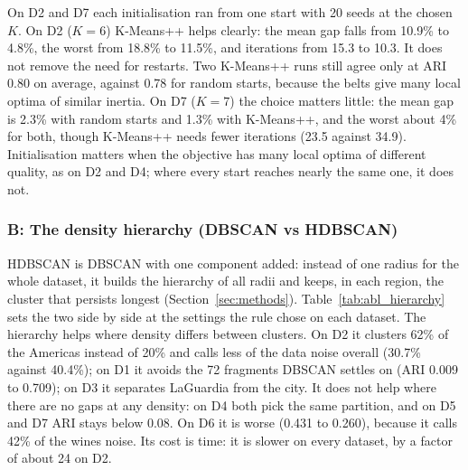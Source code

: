 On D2 and D7 each initialisation ran from one start with 20 seeds at the chosen $K$. On D2 ($K=6$)
K-Means++ helps clearly: the mean gap falls from 10.9\% to 4.8\%, the worst from 18.8\% to 11.5\%, and
iterations from 15.3 to 10.3. It does not remove the need for restarts. Two K-Means++ runs still agree
only at ARI 0.80 on average, against 0.78 for random starts, because the belts give many local optima of
similar inertia. On D7 ($K=7$) the choice matters little: the mean gap is 2.3\% with random starts and
1.3\% with K-Means++, and the worst about 4\% for both, though K-Means++ needs fewer iterations (23.5
against 34.9). Initialisation matters when the objective has many local optima of different quality, as
on D2 and D4; where every start reaches nearly the same one, it does not.

\subsubsection{B: The density hierarchy (DBSCAN vs HDBSCAN)}\label{sec:abl_hierarchy}
HDBSCAN is DBSCAN with one component added: instead of one radius for the whole dataset, it builds the
hierarchy of all radii and keeps, in each region, the cluster that persists longest
(Section~\ref{sec:methods}). Table~\ref{tab:abl_hierarchy} sets the two side by side at the settings the
rule chose on each dataset. The hierarchy helps where density differs between clusters. On D2 it clusters
62\% of the Americas instead of 20\% and calls less of the data noise overall (30.7\% against 40.4\%); on
D1 it avoids the 72 fragments DBSCAN settles on (ARI 0.009 to 0.709); on D3 it separates LaGuardia from
the city. It does not help where there are no gaps at any density: on D4 both pick the same partition, and
on D5 and D7 ARI stays below 0.08. On D6 it is worse (0.431 to 0.260), because it calls 42\% of the wines
noise. Its cost is time: it is slower on every dataset, by a factor of about 24 on D2.

